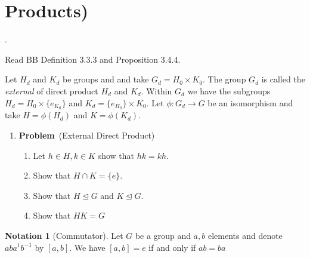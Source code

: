 \documentclass[12pt]{amsart}
\newcommand{\benu}{\begin{enumerate}}
\newcommand{\eenu}{\end{enumerate}}
\newcommand{\bed}{\begin{description}}
\newcommand{\ed}{\end{description}}
\theoremstyle{definition}
\newtheorem{notation}[theorem]{Notation}
\newcommand{\bnot}{\begin{notation}}
\newcommand{\enot}{\end{notation}}
\newcommand{\nts}{\negthinspace}
\newcommand{\itep}{\item {\bfseries Problem}\ }
\newcommand{\gen}[1]{\langle \nts#1 \nts\rangle}
\begin{document}
\begin{comment}

Read BB 7.6 through proposition 7.6.2 about solvable groups. 
\bed
\item[$S_2$]We have $S_2$ is obviously solvable. 
\item[$S_3$] We have $<e>\unlhd<(1,2,3)>\unlhd S_3$ makes $S_3$ solvable.
\item[ $S_4$ ] We have 
\[\gen{e}\unlhd\gen{(1,2)(3,4)} \lhd T_4\lhd A_4\lhd S_4
\]
makes  $S_4$ solvable.
\item[$S_n$] BB Theorem 7.7.2 shows that for $n\geq5$,$S_n$ is not solvable.
\ed

In one of the next courses after this course, {\em Galois Theory},Hunter's M722, we will see that solvability is very closely related to the solution of polynomials in radicals. The quadratic formula gives expressions for the roots of a quadratic polynomial in terms of its coefficients and radicals. The solvability of $S_3$ and $S_4$ gives analogs (solutions using just radicals and coefficients) to the quadratic formula for the general cubic and the general quadratic polynomials. That $S_5$ is not solvable for $n=5$ will lead to a proof that there is no analog to the quadratic formula for the general polynomial of degree greater than or equal to 5.
\end{comment}
\section{Products)}.

Read BB Definition 3.3.3 and Proposition 3.4.4.

Let $H_d$ and $K_d$ be groups and and take $G_d=H_0\times K_0$. The group $G_d$ is called the {\em external } of direct product $H_d$ and $K_d$. Within $G_d$ we have the subgroups $H_d=H_0\times\{e_{K_0}\}$ and $K_d=\{e_{H_0}\}\times K_0$. Let $\phi\colon G_d\to G$ be an isomorphism and take $H=\phi(H_d)$ and $K=\phi(K_d)$.
\begin{enumerate}[resume=p]
\itep (External Direct Product)
\benu
\item Let $h\in H,k\in K$ show that $hk=kh$.
\item Show that $H\cap K=\{e\}$.
\item Show that $H\unlhd G$ and $K\unlhd G$.
\item Show that $HK=G$
\eenu
\end{enumerate}
\bnot[Commutator] Let $G$ be a group and $a,b$ elements and denote $aba^{1}b^{-1}$ by $[a,b]$. We have $[a,b]=e$ if and only if $ab=ba$
\enot
\end{document}
